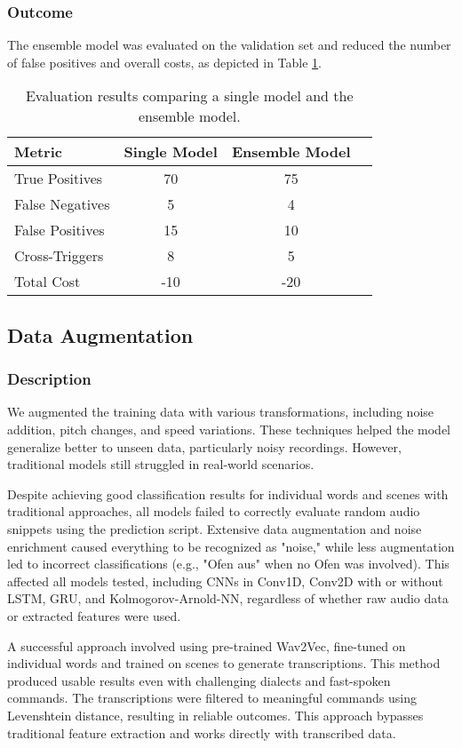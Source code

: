 \subsubsection{Outcome}
The ensemble model was evaluated on the validation set and reduced the number of false positives and overall costs, as depicted in Table \ref{tab:ensemble_results}.

\begin{table}[h]
\centering
\begin{tabular}{lccc}
\toprule
Metric & Single Model & Ensemble Model \\
\midrule
True Positives & 70 & 75 \\
False Negatives & 5 & 4 \\
False Positives & 15 & 10 \\
Cross-Triggers & 8 & 5 \\
Total Cost & -10 & -20 \\
\bottomrule
\end{tabular}
\caption{Evaluation results comparing a single model and the ensemble model.}
\label{tab:ensemble_results}
\end{table}

\subsection{Data Augmentation}
\subsubsection{Description}
We augmented the training data with various transformations, including noise addition, pitch changes, and speed variations. These techniques helped the model generalize better to unseen data, particularly noisy recordings. However, traditional models still struggled in real-world scenarios.

Despite achieving good classification results for individual words and scenes with traditional approaches, all models failed to correctly evaluate random audio snippets using the prediction script. Extensive data augmentation and noise enrichment caused everything to be recognized as "noise," while less augmentation led to incorrect classifications (e.g., "Ofen aus" when no Ofen was involved). This affected all models tested, including CNNs in Conv1D, Conv2D with or without LSTM, GRU, and Kolmogorov-Arnold-NN, regardless of whether raw audio data or extracted features were used.

A successful approach involved using pre-trained Wav2Vec, fine-tuned on individual words and trained on scenes to generate transcriptions. This method produced usable results even with challenging dialects and fast-spoken commands. The transcriptions were filtered to meaningful commands using Levenshtein distance, resulting in reliable outcomes. This approach bypasses traditional feature extraction and works directly with transcribed data.


